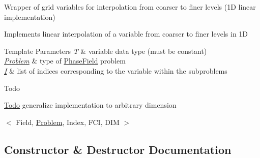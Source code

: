 Wrapper of grid variables for interpolation from coarser to finer levels (1D linear implementation) 

Implements linear interpolation of a variable from coarser to finer levels in 1D


\begin{DoxyTemplParams}{Template Parameters}
{\em T} & variable data type (must be constant) \\
\hline
{\em \hyperlink{classUintah_1_1PhaseField_1_1Problem}{Problem}} & type of \hyperlink{namespaceUintah_1_1PhaseField}{Phase\+Field} problem \\
\hline
{\em \hyperlink{structUintah_1_1PhaseField_1_1I}{I}} & list of indices corresponding to the variable within the subproblems\\
\hline
\end{DoxyTemplParams}
\begin{DoxyRefDesc}{Todo}
\item[\hyperlink{todo__todo000001}{Todo}]generalize implementation to arbitrary dimension\end{DoxyRefDesc}


$<$ Field, \hyperlink{classUintah_1_1PhaseField_1_1Problem}{Problem}, Index, F\+CI, D\+IM $>$ 

\subsection{Constructor \& Destructor Documentation}
\mbox{\label{classUintah_1_1PhaseField_1_1detail_1_1amr__interpolator_3_01ScalarField_3_01T_01_4_00_01Problem71844444bc14a03c0566689b6b502040_a9fbeccc2abec84a86e4238658ce57cc3}} 
